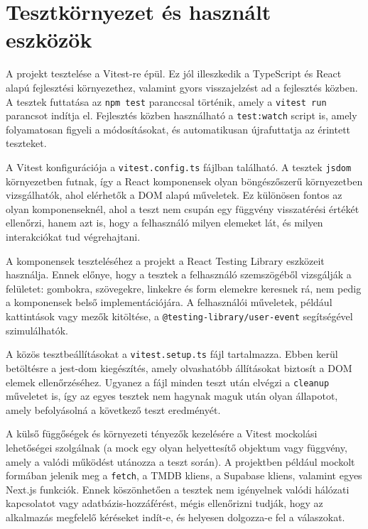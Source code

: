 \section{Tesztkörnyezet és használt eszközök}

A projekt tesztelése a Vitest-re épül. Ez jól illeszkedik a TypeScript és React alapú fejlesztési környezethez, valamint gyors visszajelzést ad a fejlesztés közben. A tesztek futtatása az \texttt{npm test} paranccsal történik, amely a \texttt{vitest run} parancsot indítja el. Fejlesztés közben használható a \texttt{test:watch} script is, amely folyamatosan figyeli a módosításokat, és automatikusan újrafuttatja az érintett teszteket.

A Vitest konfigurációja a \texttt{vitest.config.ts} fájlban található. A tesztek \texttt{jsdom} környezetben futnak, így a React komponensek olyan böngészőszerű környezetben vizsgálhatók, ahol elérhetők a DOM alapú műveletek. Ez különösen fontos az olyan komponenseknél, ahol a teszt nem csupán egy függvény visszatérési értékét ellenőrzi, hanem azt is, hogy a felhasználó milyen elemeket lát, és milyen interakciókat tud végrehajtani.

A komponensek teszteléséhez a projekt a React Testing Library eszközeit használja. Ennek előnye, hogy a tesztek a felhasználó szemszögéből vizsgálják a felületet: gombokra, szövegekre, linkekre és form elemekre keresnek rá, nem pedig a komponensek belső implementációjára. A felhasználói műveletek, például kattintások vagy mezők kitöltése, a \texttt{@testing-library/user-event} segítségével szimulálhatók.

A közös tesztbeállításokat a \texttt{vitest.setup.ts} fájl tartalmazza. Ebben kerül betöltésre a jest-dom kiegészítés, amely olvashatóbb állításokat biztosít a DOM elemek ellenőrzéséhez. Ugyanez a fájl minden teszt után elvégzi a \texttt{cleanup} műveletet is, így az egyes tesztek nem hagynak maguk után olyan állapotot, amely befolyásolná a következő teszt eredményét.

A külső függőségek és környezeti tényezők kezelésére a Vitest mockolási lehetőségei szolgálnak (a mock egy olyan helyettesítő objektum vagy függvény, amely a valódi működést utánozza a teszt során). A projektben például mockolt formában jelenik meg a \texttt{fetch}, a TMDB kliens, a Supabase kliens, valamint egyes Next.js funkciók. Ennek köszönhetően a tesztek nem igényelnek valódi hálózati kapcsolatot vagy adatbázis-hozzáférést, mégis ellenőrizni tudják, hogy az alkalmazás megfelelő kéréseket indít-e, és helyesen dolgozza-e fel a válaszokat.
